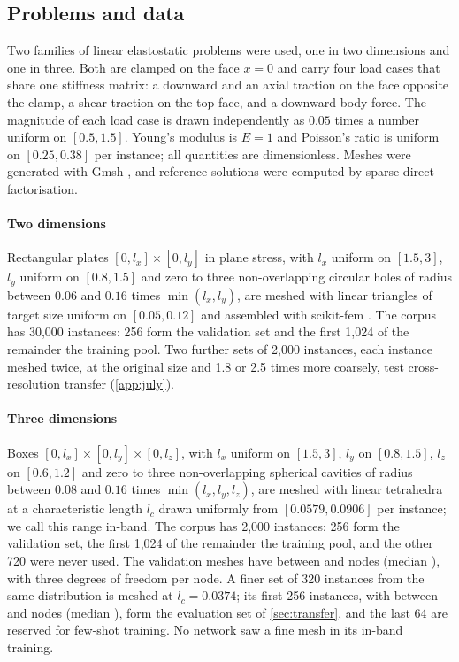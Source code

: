 \subsection{Problems and data}\label{sec:methods:data}

Two families of linear elastostatic problems were used, one in two dimensions and one in
three. Both are clamped on the face $x=0$ and carry four load cases that share one
stiffness matrix: a downward and an axial traction on the face opposite the clamp, a shear
traction on the top face, and a downward body force. The magnitude of each load case is
drawn independently as $0.05$ times a number uniform on $[0.5,1.5]$. Young's modulus is
$E=1$ and Poisson's ratio is uniform on $[0.25,0.38]$ per instance; all quantities are
dimensionless. Meshes were generated with Gmsh \cite{Geuzaine2009}, and reference solutions
were computed by sparse direct factorisation.

\paragraph{Two dimensions}
Rectangular plates $[0,l_x]\times[0,l_y]$ in plane stress, with $l_x$ uniform on $[1.5,3]$,
$l_y$ uniform on $[0.8,1.5]$ and zero to three non-overlapping circular holes of radius
between $0.06$ and $0.16$ times $\min(l_x,l_y)$, are meshed with linear triangles of target
size uniform on $[0.05,0.12]$ and assembled with scikit-fem \cite{Gustafsson2020}. The
corpus has 30,000 instances: 256 form the validation set and the first 1,024 of the
remainder the training pool. Two further sets of 2,000 instances, each instance meshed
twice, at the original size and 1.8 or 2.5 times more coarsely, test cross-resolution
transfer (\ref{app:july}).

\paragraph{Three dimensions}
Boxes $[0,l_x]\times[0,l_y]\times[0,l_z]$, with $l_x$ uniform on $[1.5,3]$, $l_y$ on
$[0.8,1.5]$, $l_z$ on $[0.6,1.2]$ and zero to three non-overlapping spherical cavities of
radius between $0.08$ and $0.16$ times $\min(l_x,l_y,l_z)$, are meshed with linear
tetrahedra at a characteristic length $l_c$ drawn uniformly from $[0.0579,0.0906]$ per
instance; we call this range in-band. The corpus has 2,000 instances: 256 form the
validation set, the first 1,024 of the remainder the training pool, and the other 720 were
never used. The validation meshes have between \numNodesInMin{} and \numNodesInMax{} nodes
(median \numNodesInMedian{}), with three degrees of freedom per node. A finer set of 320
instances from the same distribution is meshed at $l_c=0.0374$; its first 256 instances,
with between \numNodesFineMin{} and \numNodesFineMax{} nodes (median
\numNodesFineMedian{}), form the evaluation set of \cref{sec:transfer}, and the last 64 are
reserved for few-shot training. No network saw a fine mesh in its in-band training.

